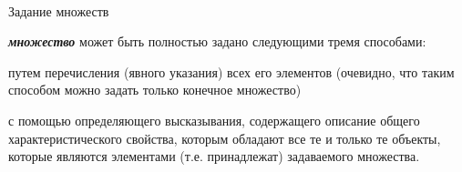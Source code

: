 \begin{frame}{\\Задание множеств}%
	\topline
	\justifying
	
	
	\textbf{\textit{множество}} может быть полностью задано следующими тремя способами:
	
	\begin{textitemize}
	\item путем перечисления (явного указания) всех его элементов (очевидно, что таким способом можно задать только конечное множество)
    \end{textitemize}

\vspace{2em}   

\vspace{-4em}   	 
\end{frame}

\begin{frame}%
	
	\begin{textitemize}	    
	\item с помощью определяющего высказывания, содержащего описание общего характеристического свойства, которым обладают все те и только те объекты, которые являются элементами (т.е. принадлежат) задаваемого множества.
    \end{textitemize}

\vspace{2em}

\vspace{-6em}      
\end{frame}

